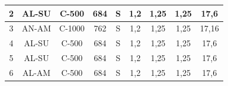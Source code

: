 \begin{table}[htbp]
\begin{tabular}{|c|c|c|c|c|cccc|}
2                                                     & AL-SU                                                      & C-500                                                           & 684                                                                                                              & S                                                         & \multicolumn{1}{c|}{1,2}                                & \multicolumn{1}{c|}{1,25}                               & \multicolumn{1}{c|}{1,25}                               & 17,6                                                            \\ \hline
3                                                     & AN-AM                                                      & C-1000                                                          & 762                                                                                                              & S                                                         & \multicolumn{1}{c|}{1,2}                                & \multicolumn{1}{c|}{1,25}                               & \multicolumn{1}{c|}{1,25}                               & 17,16                                                           \\ \hline
4                                                     & AL-SU                                                      & C-500                                                           & 684                                                                                                              & S                                                         & \multicolumn{1}{c|}{1,2}                                & \multicolumn{1}{c|}{1,25}                               & \multicolumn{1}{c|}{1,25}                               & 17,6                                                            \\ \hline
5                                                     & AL-SU                                                      & C-500                                                           & 684                                                                                                              & S                                                         & \multicolumn{1}{c|}{1,2}                                & \multicolumn{1}{c|}{1,25}                               & \multicolumn{1}{c|}{1,25}                               & 17,6                                                            \\ \hline
6                                                     & AL-AM                                                      & C-500                                                           & 684                                                                                                              & S                                                         & \multicolumn{1}{c|}{1,2}                                & \multicolumn{1}{c|}{1,25}                               & \multicolumn{1}{c|}{1,25}                               & 17,6                                                            \\ \hline

\end{tabular}
\end{table}
